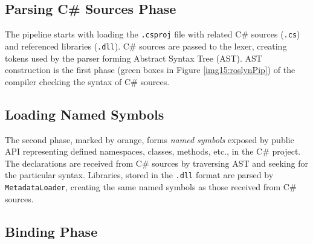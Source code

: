 \subsection{Parsing C\# Sources Phase}

The pipeline starts with loading the \texttt{.csproj} file with related C\# sources (\texttt{.cs}) and referenced libraries (\texttt{.dll}).
C\# sources are passed to the lexer, creating tokens used by the parser forming Abstract Syntax Tree (AST).
AST construction is the first phase (green boxes in Figure \ref{img15:roslynPip}) of the compiler checking the syntax of C\# sources.

\subsection{Loading Named Symbols}

The second phase, marked by orange, forms \emph{named symbols} exposed by public API representing defined namespaces, classes, methods, etc., in the C\# project. 
The declarations are received from C\# sources by traversing AST and seeking for the particular syntax. 
Libraries, stored in the \texttt{.dll} format are parsed by \texttt{MetadataLoader}, creating the same named symbols as those received from C\# sources.

\subsection{Binding Phase}

